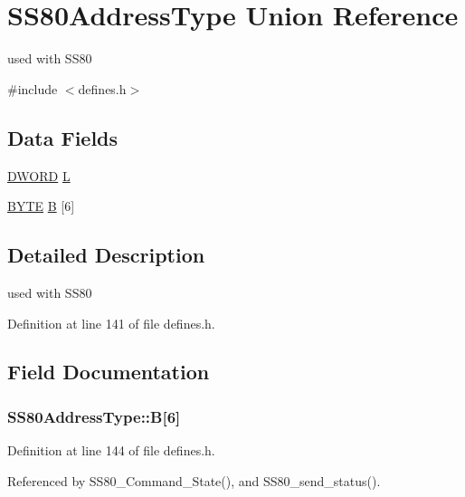 \hypertarget{unionSS80AddressType}{}\section{S\+S80\+Address\+Type Union Reference}
\label{unionSS80AddressType}


used with S\+S80  




{\ttfamily \#include $<$defines.\+h$>$}

\subsection*{Data Fields}
\begin{DoxyCompactItemize}
\item 
\hyperlink{integer_8h_ad342ac907eb044443153a22f964bf0af}{D\+W\+O\+RD} \hyperlink{unionSS80AddressType_a4949ed9f8da550f9e09937db92750586}{L}
\item 
\hyperlink{integer_8h_a4ae1dab0fb4b072a66584546209e7d58}{B\+Y\+TE} \hyperlink{unionSS80AddressType_a0f11f4f6624071d1844f92934f05a8f9}{B} \mbox{[}6\mbox{]}
\end{DoxyCompactItemize}


\subsection{Detailed Description}
used with S\+S80 

Definition at line 141 of file defines.\+h.



\subsection{Field Documentation}
\subsubsection[{\texorpdfstring{B}{B}}]{ S\+S80\+Address\+Type\+::B\mbox{[}6\mbox{]}}\hypertarget{unionSS80AddressType_a0f11f4f6624071d1844f92934f05a8f9}{}\label{unionSS80AddressType_a0f11f4f6624071d1844f92934f05a8f9}


Definition at line 144 of file defines.\+h.



Referenced by S\+S80\+\_\+\+Command\+\_\+\+State(), and S\+S80\+\_\+send\+\_\+status().

